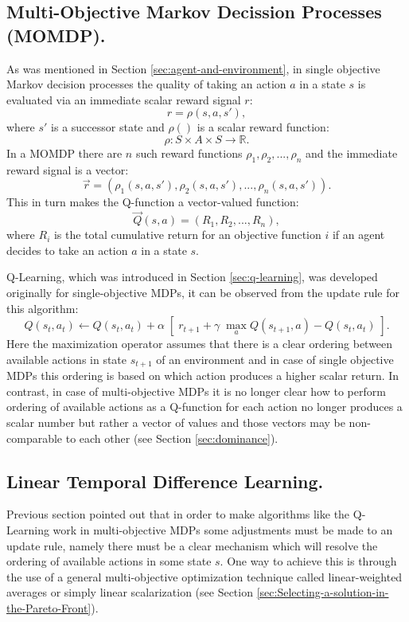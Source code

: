 \subsection{Multi-Objective Markov Decission Processes (MOMDP).}
As was mentioned in Section \ref{sec:agent-and-environment}, in single objective Markov decision processes the quality of taking an action $a$ in a state $s$ is evaluated via an immediate scalar reward signal $r$:
$$ r = \rho(s,a,s'), $$
where $s'$ is a successor state and $\rho()$ is a scalar reward function:
$$ \rho : S \times A \times  S \rightarrow \mathbb{R}. $$
In a MOMDP there are $n$ such reward functions $\rho_{1},\rho_{2},...,\rho_{n}$ and the immediate reward signal is a vector:
$$ \vec{r} = (\rho_{1}(s,a,s'),\rho_{2}(s,a,s'),...,\rho_{n}(s,a,s')). $$
This in turn makes the Q-function a vector-valued function:
$$ \vec{Q}(s,a) = (R_{1},R_{2},...,R_{n}), $$
where $R_{i}$ is the total cumulative return for an objective function $i$ if an agent decides to take an action $a$ in a state $s$.

Q-Learning, which was introduced in Section \ref{sec:q-learning}, was developed originally for single-objective MDPs, it can be observed from the update rule for this algorithm:
$$ Q(s_{t},a_{t}) \leftarrow Q(s_{t},a_{t}) + \alpha \; \left[\;r_{t+1} + \gamma\; \max_{a}Q(s_{t+1},a) - Q(s_{t},a_{t})\;\right]. $$
Here the maximization operator assumes that there is a clear ordering between available actions in state $s_{t+1}$ of an environment and in case of single objective MDPs this ordering is based on which action produces a higher scalar return. In contrast, in case of multi-objective MDPs it is no longer clear how to perform ordering of available actions as a Q-function for each action no longer produces a scalar number but rather a vector of values and those vectors may be non-comparable to each other (see Section \ref{sec:dominance}).

\subsection{Linear Temporal Difference Learning.}
Previous section pointed out that in order to make algorithms like the Q-Learning work in multi-objective MDPs some adjustments must be made to an update rule, namely there must be a clear mechanism which will resolve the ordering of available actions in some state $s$. One way to achieve this is through the use of a general multi-objective optimization technique called linear-weighted averages or simply linear scalarization (see Section \ref{sec:Selecting-a-solution-in-the-Pareto-Front}).

